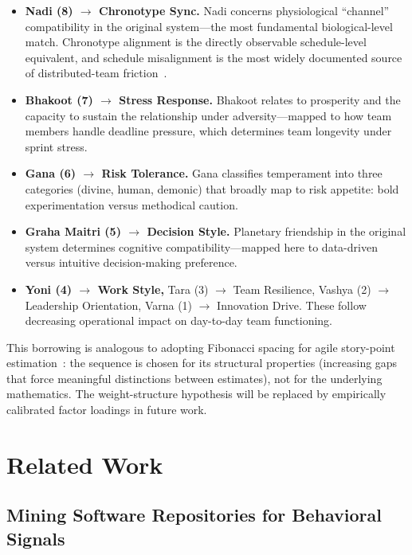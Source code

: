 \documentclass[conference]{IEEEtran}
\begin{document}
\begin{itemize}
  \item \textbf{Nadi (8) $\to$ Chronotype Sync.}  Nadi concerns
    physiological ``channel'' compatibility in the original
    system---the most fundamental biological-level match.
    Chronotype alignment is the directly observable schedule-level
    equivalent, and schedule misalignment is the most widely
    documented source of distributed-team friction~\cite{holmstrom2006}.
  \item \textbf{Bhakoot (7) $\to$ Stress Response.}  Bhakoot
    relates to prosperity and the capacity to sustain the relationship
    under adversity---mapped to how team members handle deadline
    pressure, which determines team longevity under sprint stress.
  \item \textbf{Gana (6) $\to$ Risk Tolerance.}  Gana classifies
    temperament into three categories (divine, human, demonic) that
    broadly map to risk appetite: bold experimentation versus
    methodical caution.
  \item \textbf{Graha Maitri (5) $\to$ Decision Style.}  Planetary
    friendship in the original system determines cognitive
    compatibility---mapped here to data-driven versus intuitive
    decision-making preference.
  \item \textbf{Yoni (4) $\to$ Work Style,} Tara (3) $\to$ Team
    Resilience, Vashya (2) $\to$ Leadership Orientation,
    Varna (1) $\to$ Innovation Drive.  These follow decreasing
    operational impact on day-to-day team functioning.
\end{itemize}

This borrowing is analogous to adopting Fibonacci spacing for agile
story-point estimation~\cite{wainer2000}: the sequence is chosen for
its structural properties (increasing gaps that force meaningful
distinctions between estimates), not for the underlying mathematics.
The weight-structure hypothesis will be replaced by empirically
calibrated factor loadings in future work.

\section{Related Work}
\label{sec:related}

\subsection{Mining Software Repositories for Behavioral Signals}
\end{document}
